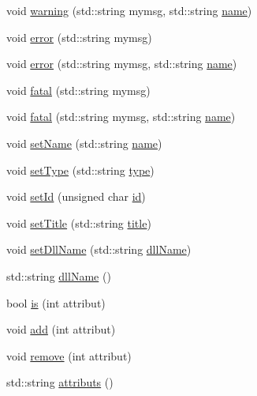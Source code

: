 \begin{DoxyCompactItemize}
\item 
void \hyperlink{classObject_a11f101db4dd73d9391b0231818881d86}{warning} (std\+::string mymsg, std\+::string \hyperlink{classObject_a300f4c05dd468c7bb8b3c968868443c1}{name})
\item 
void \hyperlink{classObject_a204a95f57818c0f811933917a30eff45}{error} (std\+::string mymsg)
\item 
void \hyperlink{classObject_ad7f6c457733082efa2f9ff5f5c8e119a}{error} (std\+::string mymsg, std\+::string \hyperlink{classObject_a300f4c05dd468c7bb8b3c968868443c1}{name})
\item 
void \hyperlink{classObject_aad5a16aac7516ce65bd5ec02ab07fc80}{fatal} (std\+::string mymsg)
\item 
void \hyperlink{classObject_ae62acd3d09f716220f75f252dc38bc9a}{fatal} (std\+::string mymsg, std\+::string \hyperlink{classObject_a300f4c05dd468c7bb8b3c968868443c1}{name})
\item 
void \hyperlink{classObject_ae30fea75683c2d149b6b6d17c09ecd0c}{set\+Name} (std\+::string \hyperlink{classObject_a300f4c05dd468c7bb8b3c968868443c1}{name})
\item 
void \hyperlink{classObject_aae534cc9d982bcb9b99fd505f2e103a5}{set\+Type} (std\+::string \hyperlink{classObject_a84f99f70f144a83e1582d1d0f84e4e62}{type})
\item 
void \hyperlink{classObject_a398fe08cba594a0ce6891d59fe4f159f}{set\+Id} (unsigned char \hyperlink{classObject_af99145335cc61ff6e2798ea17db009d2}{id})
\item 
void \hyperlink{classObject_a89557dbbad5bcaa02652f5d7fa35d20f}{set\+Title} (std\+::string \hyperlink{classObject_a73a0f1a41828fdd8303dd662446fb6c3}{title})
\item 
void \hyperlink{classObject_a870c5af919958c2136623b2d7816d123}{set\+Dll\+Name} (std\+::string \hyperlink{classObject_a2e3947f2870094c332d7454117f3ec63}{dll\+Name})
\item 
std\+::string \hyperlink{classObject_a2e3947f2870094c332d7454117f3ec63}{dll\+Name} ()
\item 
bool \hyperlink{classAttrib_a704f26af560909ad22065083bb7d4c34}{is} (int attribut)
\item 
void \hyperlink{classAttrib_a235f773af19c900264a190b00a3b4ad7}{add} (int attribut)
\item 
void \hyperlink{classAttrib_a7d4ef7e32d93cb287792b87b857e79f3}{remove} (int attribut)
\item 
std\+::string \hyperlink{classAttrib_aee7bbf16b144887f196e1341b24f8a26}{attributs} ()
\end{DoxyCompactItemize}
